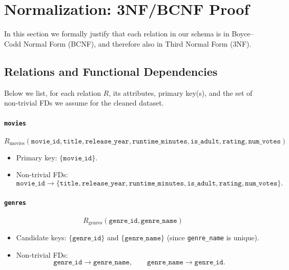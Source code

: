 \documentclass{article}
\begin{document}
\section{Normalization: 3NF/BCNF Proof}
\label{sec:normalization-bcnf}

In this section we formally justify that each relation in our schema is in Boyce--Codd Normal Form (BCNF), and therefore also in Third Normal Form (3NF).


\subsection*{Relations and Functional Dependencies}

Below we list, for each relation $R$, its attributes, primary key(s), and the set of non-trivial FDs we assume for the cleaned dataset.

\paragraph{\texttt{movies}}

\[
R_{\text{movies}}( \texttt{movie\_id}, \texttt{title}, \texttt{release\_year}, \texttt{runtime\_minutes}, \texttt{is\_adult}, \texttt{rating}, \texttt{num\_votes} )
\]

\begin{itemize}
    \item Primary key: $\{\texttt{movie\_id}\}$.
    \item Non-trivial FDs:
    \[
    \texttt{movie\_id} \rightarrow \{\texttt{title}, \texttt{release\_year}, \texttt{runtime\_minutes}, \texttt{is\_adult}, \texttt{rating}, \texttt{num\_votes}\}.
    \]
\end{itemize}

\paragraph{\texttt{genres}}

\[
R_{\text{genres}}( \texttt{genre\_id}, \texttt{genre\_name} )
\]

\begin{itemize}
    \item Candidate keys: $\{\texttt{genre\_id}\}$ and $\{\texttt{genre\_name}\}$ (since \texttt{genre\_name} is unique).
    \item Non-trivial FDs:
    \[
    \texttt{genre\_id} \rightarrow \texttt{genre\_name}, \qquad
    \texttt{genre\_name} \rightarrow \texttt{genre\_id}.
    \]
\end{itemize}
\end{document}
